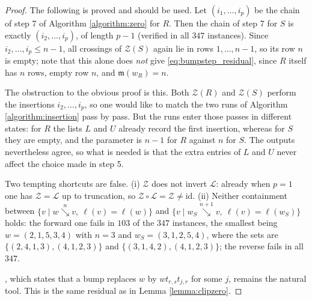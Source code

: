 \documentclass{amsart}
\theoremstyle{definition}
\theoremstyle{remark}
\numberwithin{equation}{subsection}
\newcommand{\downvar}[1]{\stackrel{#1}{\searrow}}
\newcommand{\wof}[1]{w_{#1}}
\newcommand{\zeromap}{\mathcal{Z}}
\newcommand{\lmap}{\mathscr{L}}
\newcommand{\maxd}{\mathfrak{m}}
\begin{document}
\begin{proof}
{The following is proved and should be used. Let $(i_1,\ldots,i_p)$ be the chain of step 7 of Algorithm \ref{algorithm:zero} for $R$. Then the chain of step 7 for $S$ is exactly $(i_2,\ldots,i_p)$, of length $p-1$ (verified in all $347$ instances). Since $i_2,\ldots,i_p\leq n-1$, all crossings of $\zeromap(S)$ again lie in rows $1,\ldots,n-1$, so its row $n$ is empty; note that this alone does \emph{not} give \eqref{eq:bumpstep_residual}, since $R$ itself has $n$ rows, empty row $n$, and $\maxd(\wof R)=n$.

The obstruction to the obvious proof is this. Both $\zeromap(R)$ and $\zeromap(S)$ perform the insertions $i_2,\ldots,i_p$, so one would like to match the two runs of Algorithm \ref{algorithm:insertion} pass by pass. But the runs enter those passes in different states: for $R$ the lists $L$ and $U$ already record the first insertion, whereas for $S$ they are empty, and the parameter is $n-1$ for $R$ against $n$ for $S$. The outputs nevertheless agree, so what is needed is that the extra entries of $L$ and $U$ never affect the choice made in step 5.

Two tempting shortcuts are false. (i) $\zeromap$ does not invert $\lmap$: already when $p=1$ one has $\zeromap=\lmap$ up to truncation, so $\zeromap\circ\lmap=\zeromap\neq\mathrm{id}$. (ii) Neither containment between $\{v\mid w\downvar{n}v,\ \ell(v)=\ell(w)\}$ and $\{v\mid \wof S\downvar{n+1}v,\ \ell(v)=\ell(\wof S)\}$ holds: the forward one fails in $103$ of the $347$ instances, the smallest being $w=(2,1,5,3,4)$ with $n=3$ and $\wof S=(3,1,2,5,4)$, where the sets are $\{(2,4,1,3),(4,1,2,3)\}$ and $\{(3,1,4,2),(4,1,2,3)\}$; the reverse fails in all $347$.

\cite[Lemma~6]{little2003combinatorial}, which states that a bump replaces $w$ by $wt_{r,s}t_{j,r}$ for some $j$, remains the natural tool. This is the same residual as in Lemma \ref{lemma:clipzero}.}
\end{proof}
\end{document}
